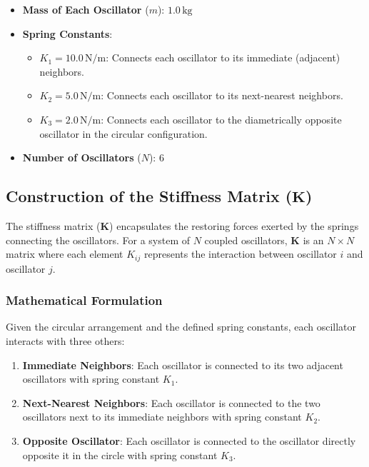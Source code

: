 \documentclass[12pt]{report} %
\begin{document}
\begin{itemize}
    \item \textbf{Mass of Each Oscillator} (\( m \)): \( 1.0 \, \text{kg} \)
    \item \textbf{Spring Constants}:
    \begin{itemize}
        \item \( K_1 = 10.0 \, \text{N/m} \): Connects each oscillator to its immediate (adjacent) neighbors.
        \item \( K_2 = 5.0 \, \text{N/m} \): Connects each oscillator to its next-nearest neighbors.
        \item \( K_3 = 2.0 \, \text{N/m} \): Connects each oscillator to the diametrically opposite oscillator in the circular configuration.
    \end{itemize}
    \item \textbf{Number of Oscillators} (\( N \)): \( 6 \)
\end{itemize}

\subsection{Construction of the Stiffness Matrix (\( \mathbf{K} \))}
\label{subsec:part2_task2_K_matrix}

The stiffness matrix (\( \mathbf{K} \)) encapsulates the restoring forces exerted by the springs connecting the oscillators. For a system of \( N \) coupled oscillators, \( \mathbf{K} \) is an \( N \times N \) matrix where each element \( K_{ij} \) represents the interaction between oscillator \( i \) and oscillator \( j \).

\subsubsection{Mathematical Formulation}
\label{subsubsec:part2_task2_K_matrix_math}

Given the circular arrangement and the defined spring constants, each oscillator interacts with three others:

\begin{enumerate}
    \item \textbf{Immediate Neighbors}: Each oscillator is connected to its two adjacent oscillators with spring constant \( K_1 \).
    \item \textbf{Next-Nearest Neighbors}: Each oscillator is connected to the two oscillators next to its immediate neighbors with spring constant \( K_2 \).
    \item \textbf{Opposite Oscillator}: Each oscillator is connected to the oscillator directly opposite it in the circle with spring constant \( K_3 \).
\end{enumerate}
\end{document}
